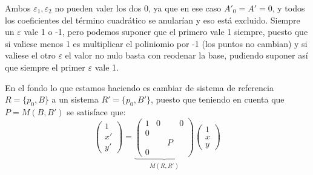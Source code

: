 \documentclass[10pt,a4paper,openright]{book}
\begin{document}
Ambos $\varepsilon_1 , \varepsilon_2$ no pueden valer los dos 0, ya que en ese caso $A'_0 = A'= 0$, y todos los coeficientes del término cuadrático se anularían y eso está excluido. Siempre un $\varepsilon$ vale 1 o -1, pero podemos suponer que el primero vale 1 siempre, puesto que si valiese menos 1 es multiplicar el poliniomio por -1 (los puntos no cambian) y si valiese el otro $\varepsilon$ el valor no nulo basta con reodenar la base, pudiendo suponer así que siempre el primer $\varepsilon$ vale 1.

En el fondo lo que estamos haciendo es cambiar de sistema de referencia $R=\{p_0, B\}$ a un sistema $R'=\{p_0, B'\}$, puesto que teniendo en cuenta que $P = M(B,B')$ se satisface que:
$$\begin{pmatrix} 1 \\ x' \\ y'\end{pmatrix} = \underbrace{\left(\begin{array}{c|ccc} 1 & 0 &  & 0 \\ \hline 0 &  &  &  \\  &  & P &  \\ 0 &  & & 
\end{array}\right)}_{M(R,R')} \begin{pmatrix} 1 \\ x \\ y \end{pmatrix}$$
\end{document}
